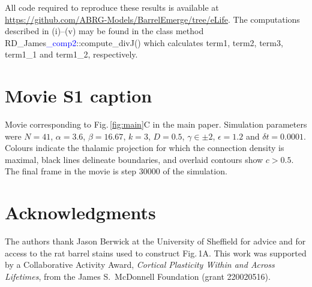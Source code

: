 \documentclass[9pt,lineno]{elife}
\newcommand{\cmnt}[1]{\textcolor{blue}{#1}}
\newcommand{\code}[1]{\textsf{#1}}
\begin{document}
All code required to reproduce these results is available at
\url{https://github.com/ABRG-Models/BarrelEmerge/tree/eLife}. The computations
described in (i)--(v) may be found in the class method
\code{RD\_James\cmnt{\_comp2}::compute\_divJ()} which calculates \code{term1},
\code{term2}, \code{term3}, \code{term1\_1} and \code{term1\_2}, respectively.

\section{Movie S1 caption}

Movie corresponding to Fig.\,\ref{fig:main}C in the main paper. Simulation parameters were
$N=41$, $\alpha=3.6$, $\beta=16.67$, $k=3$, $D=0.5$, $\gamma\in\pm 2$,
$\epsilon=1.2$ and $\delta{t}=0.0001$. Colours indicate the thalamic
projection for which the connection density is maximal, black lines delineate
boundaries, and overlaid contours show $c>0.5$. The final frame in the movie
is step 30000 of the simulation.

\section{Acknowledgments}

The authors thank Jason Berwick at the University of Sheffield for advice and
for access to the rat barrel stains used to construct Fig.\,1A. This work was
supported by a Collaborative Activity Award, \emph{Cortical Plasticity Within
  and Across Lifetimes}, from the James S.~McDonnell Foundation (grant
220020516).


\end{document}
